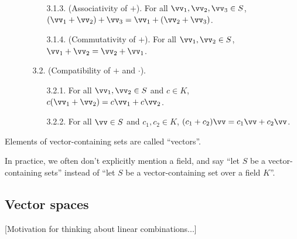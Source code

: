 \begin{defn}
\begin{enumerate}
\begin{enumerate}
\begin{enumerate}
                \item[3.1.3.] (Associativity of $+$). For all $\vv_1, \vv_2, \vv_3 \in S$, $(\vv_1 + \vv_2) + \vv_3 = \vv_1 + (\vv_2 + \vv_3)$.
                \item[3.1.4.] (Commutativity of $+$). For all $\vv_1, \vv_2 \in S$, $\vv_1 + \vv_2 = \vv_2 + \vv_1$.
            \end{enumerate}
            \item[3.2.] (Compatibility of $+$ and $\cdot$).
            \begin{enumerate}
                \item[3.2.1.] For all $\vv_1, \vv_2 \in S$ and $c \in K$, $c(\vv_1 + \vv_2) = c \vv_1 + c \vv_2$.
                \item[3.2.2.] For all $\vv \in S$ and $c_1, c_2 \in K$, $(c_1 + c_2)\vv = c_1 \vv + c_2 \vv$.
            \end{enumerate}
        \end{enumerate}
    \end{enumerate}
    
    Elements of vector-containing sets are called ``vectors''.
    
    In practice, we often don't explicitly mention a field, and say ``let $S$ be a vector-containing sets'' instead of ``let $S$ be a vector-containing set over a field $K$''.
\end{defn}

\newpage

\subsection*{Vector spaces}

[Motivation for thinking about linear combinations...]

